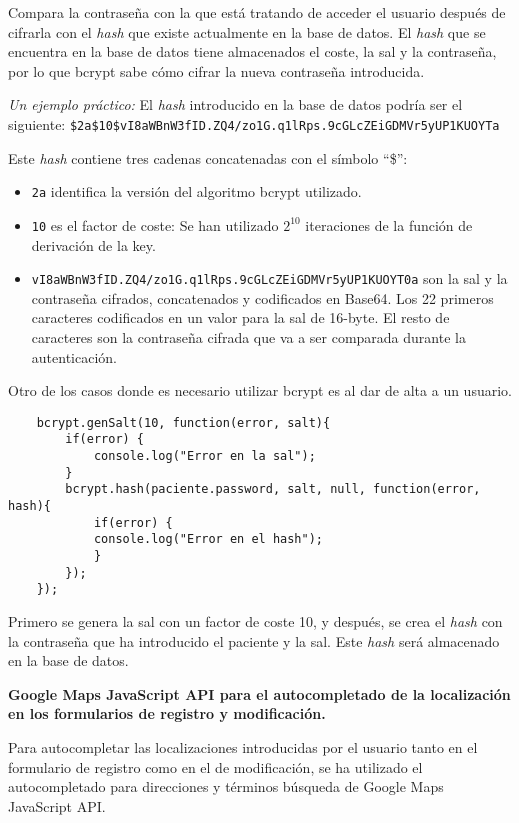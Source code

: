 Compara la contraseña con la que está tratando de acceder el usuario después de cifrarla con el \textit{hash} que existe actualmente en la base de datos. El \textit{hash} que se encuentra en la base de datos tiene almacenados el coste, la sal y la contraseña, por lo que bcrypt sabe cómo cifrar la nueva contraseña introducida.


\textit{Un ejemplo práctico\cite{bcrypt_ejemplo}:}
El \textit{hash} introducido en la base de datos podría ser el siguiente:
\texttt{\$2a\$10\$vI8aWBnW3fID.ZQ4/zo1G.q1lRps.9cGLcZEiGDMVr5yUP1KUOYTa}


Este \textit{hash} contiene tres cadenas concatenadas con el símbolo ``\$'':
\begin{itemize}
\item \texttt{2a} identifica la versión del algoritmo bcrypt utilizado.
\item \texttt{10} es el factor de coste: Se han utilizado $2^{10}$ iteraciones de la función de derivación de la key.
\item \texttt{vI8aWBnW3fID.ZQ4/zo1G.q1lRps.9cGLcZEiGDMVr5yUP1KUOYT0a} son la sal y la contraseña cifrados, concatenados y codificados en Base64. Los 22 primeros caracteres codificados en un valor para la sal de 16-byte. El resto de caracteres son la contraseña cifrada que va a ser comparada durante la autenticación.
\end{itemize}


Otro de los casos donde es necesario utilizar bcrypt es al dar de alta a un usuario.


\medskip
\begin{lstlisting}
	bcrypt.genSalt(10, function(error, salt){
		if(error) {
			console.log("Error en la sal");
		}
		bcrypt.hash(paciente.password, salt, null, function(error, hash){
			if(error) {
			console.log("Error en el hash");
			} 
		});
	});
\end{lstlisting}


Primero se genera la sal con un factor de coste 10, y después, se crea el \textit{hash} con la contraseña que ha introducido el paciente y la sal. Este \textit{hash} será almacenado en la base de datos.\newline


\textbf{Google Maps JavaScript API para el autocompletado de la localización en los formularios de registro y modificación\cite{google_api}.}


Para autocompletar las localizaciones introducidas por el usuario tanto en el formulario de registro como en el de modificación, se ha utilizado el autocompletado para direcciones y términos búsqueda de Google Maps JavaScript API. 


